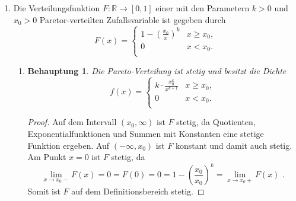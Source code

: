 \documentclass[a4paper]{scrartcl}
\newtheorem*{behaupt}{Behauptung}
\def \blattnr {11}
\begin{document}
\begin{enumerate}[label=\bfseries \blattnr.\arabic*]
    \item %
        Die Verteilungsfunktion $F\colon \mathbb{R} \to [0,1]$ einer mit den
        Parametern $k > 0$ und $x_0 > 0$ Paretor-verteilten Zufallsvariable 
        ist gegeben durch
        \begin{equation*}
            F(x) =
            \begin{cases}
                1 - \left( \frac{x_0}{x} \right)^k & x \geq x_0, \\
                0 & x < x_0. \\
            \end{cases}
        \end{equation*}
        \begin{enumerate}
            \item
                \begin{behaupt}
                    Die Pareto-Verteilung ist stetig und besitzt die Dichte
                    \begin{equation}
                        f(x) =
                        \begin{cases}
                            k \cdot \frac{x_0^k}{x^{k+1}} & x \geq x_0, \\
                            0 & x < x_0. \\
                        \end{cases}
                        \label{eq:dichte}
                    \end{equation}
                \end{behaupt}
                \begin{proof}
                    Auf dem Intervall $(x_0,\infty)$ ist $F$ stetig, da
                    Quotienten, Exponentialfunktionen und Summen mit Konstanten
                    eine stetige Funktion ergeben.
                    Auf $(-\infty,x_0)$ ist $F$ konstant und damit auch stetig.
                    Am Punkt $x = 0$ ist $F$ stetig, da
                    \begin{equation*}
                        \lim_{x \to x_0-} F(x)
                        = 0
                        = F(0)
                        = 0
                        = 1 - \left( \frac{x_0}{x_0} \right)^k
                        = \lim_{x \to x_0+} F(x)
                        \text{ .}
                    \end{equation*}
                    Somit ist $F$ auf dem Definitionsbereich stetig.


\end{proof}
\end{enumerate}
\end{enumerate}
\end{document}
